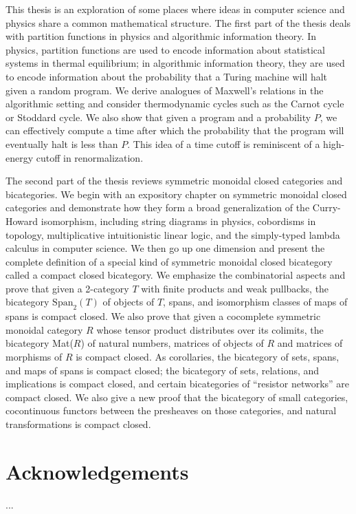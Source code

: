 \documentclass[12pt,twoside,openright]{report}
\newcommand{\Span}{\mbox{Span}}
\begin{document}
This thesis is an exploration of some places where ideas in computer science and physics share a common mathematical structure.  The first part of the thesis deals with partition functions in physics and algorithmic information theory.  In physics, partition functions are used to encode information about statistical systems in thermal equilibrium; in algorithmic information theory, they are used to encode information about the probability that a Turing machine will halt given a random program.  We derive analogues of Maxwell's relations in the algorithmic setting and consider thermodynamic cycles such as the Carnot cycle or Stoddard cycle.  We also show that given a program and a probability $P$, we can effectively compute a time after which the probability that the program will eventually halt is less than $P$.  This idea of a time cutoff is reminiscent of a high-energy cutoff in renormalization.

The second part of the thesis reviews symmetric monoidal closed categories and bicategories.   We begin with an expository chapter on symmetric monoidal closed categories and demonstrate how they form a broad generalization of the Curry-Howard isomorphism, including string diagrams in physics, cobordisms in topology, multiplicative intuitionistic linear logic, and the simply-typed lambda calculus in computer science.  We then go up one dimension and present the complete definition of a special kind of symmetric monoidal closed bicategory called a compact closed bicategory.  We emphasize the combinatorial aspects and prove that given a 2-category $T$ with finite products and weak pullbacks, the bicategory $\Span_2(T)$ of objects of $T$, spans, and isomorphism classes of maps of spans is compact closed.  We also prove that given a cocomplete symmetric monoidal category $R$ whose tensor product distributes over its colimits, the bicategory Mat($R$) of natural numbers, matrices of objects of $R$ and matrices of morphisms of $R$ is compact closed.  As corollaries, the bicategory of sets, spans, and maps of spans is compact closed; the bicategory of sets, relations, and implications is compact closed, and certain bicategories of ``resistor networks'' are compact closed.  We also give a new proof that the bicategory of small categories, cocontinuous functors between the presheaves on those categories, and natural transformations is compact closed.


  \vfill
  \pagebreak

  \chapter*{Acknowledgements}
  ...
  \vfill
  \pagebreak
\end{document}
